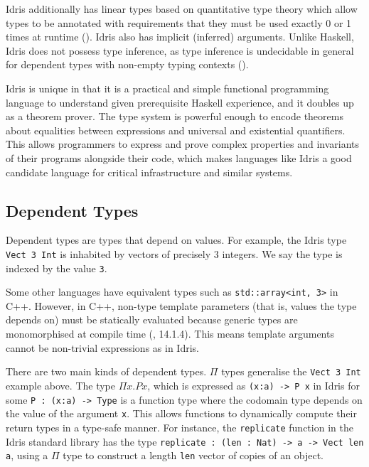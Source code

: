\documentclass[]{report}
\begin{document}
Idris additionally has linear types based on quantitative type theory which allow types to be annotated with requirements that they must be used exactly 0 or 1 times at runtime (\cite{brady2021qtt}). Idris also has implicit (inferred) arguments. Unlike Haskell, Idris does not possess type inference, as type inference is undecidable in general for dependent types with non-empty typing contexts (\cite{dowek1993undecidability}). %

Idris is unique in that it is a practical and simple functional programming language to understand given prerequisite Haskell experience, and it doubles up as a theorem prover. The type system is powerful enough to encode theorems about equalities between expressions and universal and existential quantifiers. This allows programmers to express and prove complex properties and invariants of their programs alongside their code, which makes languages like Idris a good candidate language for critical infrastructure and similar systems.

\subsection{Dependent Types}

Dependent types are types that depend on values. For example, the Idris type \texttt{Vect 3 Int} is inhabited by vectors of precisely 3 integers. We say the type is indexed by the value \texttt{3}.

Some other languages have equivalent types such as \texttt{std::array<int, 3>} in C++. However, in C++, non-type template parameters (that is, values the type depends on) must be statically evaluated because generic types are monomorphised at compile time (\cite{ISO:CPP}, 14.1.4). This means template arguments cannot be non-trivial expressions as in Idris.

There are two main kinds of dependent types. $\Pi$ types generalise the \texttt{Vect 3 Int} example above. The type $\Pi x.Px$, which is expressed as \texttt{(x:a) -> P x} in Idris for some \texttt{P : (x:a) -> Type} is a function type where the codomain type depends on the value of the argument \texttt{x}. This allows functions to dynamically compute their return types in a type-safe manner. For instance, the \texttt{replicate} function in the Idris standard library has the type \texttt{replicate : (len : Nat) -> a -> Vect len a}, using a $\Pi$ type to construct a length \texttt{len} vector of copies of an object.
\end{document}
